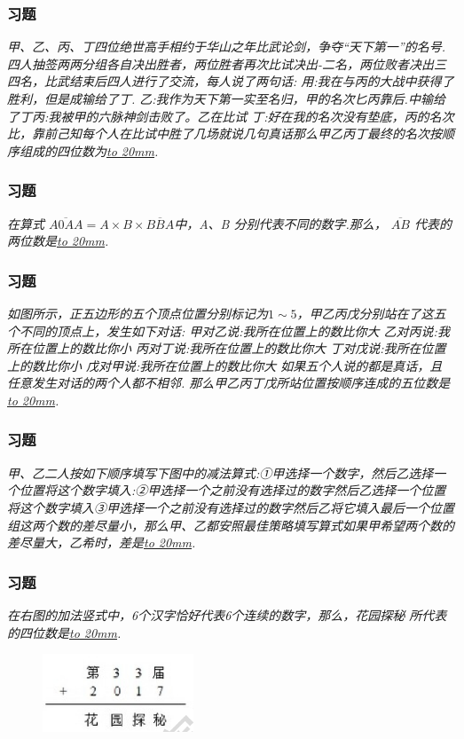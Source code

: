 \begin{frame}
    \frametitle{习题\theframecounter}
    \textit{甲、乙、丙、丁四位绝世高手相约于华山之年比武论剑，争夺“天下第一”的名号.四人抽签两两分组各自决出胜者，两位胜者再次比试决出-二名，两位败者决出三四名，比武结束后四人进行了交流，每人说了两句话:
用:我在与丙的大战中获得了胜利，但是成输给了丁.
乙:我作为天下第一实至名归，甲的名次匕丙靠后.中输给了丁丙:我被甲的六脉神剑击败了。乙在比试
丁:好在我的名次没有垫底，丙的名次比，靠前己知每个人在比试中胜了几场就说几句真话那么甲乙丙丁最终的名次按顺序组成的四位数为\underline{\hbox to 20mm{}}.}
\end{frame}


\begin{frame}
    \frametitle{习题\theframecounter}
    \textit{在算式 $\overline{A0AA}= A\times B\times \overline{BBA}$中，A、B 分别代表不同的数字.那么， $\overline{AB}$ 代表的两位数是\underline{\hbox to 20mm{}}.}
\end{frame}


\begin{frame}
    \frametitle{习题\theframecounter}
    \textit{如图所示，正五边形的五个顶点位置分别标记为$1\sim 5$，甲乙丙戊分别站在了这五个不同的顶点上，发生如下对话:
甲对乙说:我所在位置上的数比你大
乙对丙说:我所在位置上的数比你小
丙对丁说:我所在位置上的数比你大
丁对戊说:我所在位置上的数比你小
戊对甲说:我所在位置上的数比你大
如果五个人说的都是真话，且任意发生对话的两个人都不相邻. 那么甲乙丙丁戊所站位置按顺序连成的五位数是\underline{\hbox to 20mm{}}.}
\end{frame}


\begin{frame}
    \frametitle{习题\theframecounter}
    \textit{甲、乙二人按如下顺序填写下图中的减法算式:①甲选择一个数字，然后乙选择一个位置将这个数字填入:②甲选择一个之前没有选择过的数字然后乙选择一个位置将这个数字填入③甲选择一个之前没有选择过的数字然后乙将它填入最后一个位置组这两个数的差尽量小，那么甲、乙都安照最佳策略填写算式如果甲希望两个数的差尽量大，乙希时，差是\underline{\hbox to 20mm{}}.}
\end{frame}


\begin{frame}
    \frametitle{习题\theframecounter}
    \textit{在右图的加法竖式中，6个汉字恰好代表6个连续的数字，那么，花园探秘 所代表的四位数是\underline{\hbox to 20mm{}}.}
    \begin{figure}[H] 
        \centering
        \includegraphics[width=0.4\textwidth]{./pics/Chapter_7/12.png}
    \end{figure}
\end{frame}


